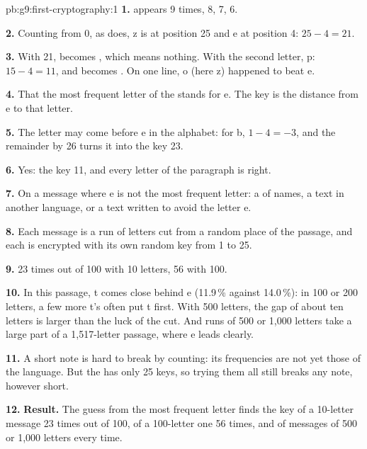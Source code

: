 \begin{solution}{pb:g9:first-cryptography:1}
\textbf{1.}  appears 9 times,  8,  7,  6.

\textbf{2.} Counting from 0, as  does, z is at
position 25 and e at position 4: $25 - 4 = 21$.

\textbf{3.} With 21,  becomes , which means nothing. With the
second letter, p: $15 - 4 = 11$, and  becomes . On one line,
o (here z) happened to beat e.

\textbf{4.} That the most frequent letter of the  stands for e. The key
is the distance from e to that letter.

\textbf{5.} The letter may come before e in the alphabet: for b, $1 - 4 = -3$, and
the remainder by 26 turns it into the key 23.

\label{out:g9:first-cryptography:guess-shift}

\textbf{6.} Yes: the key 11, and every letter of the paragraph is right.

\textbf{7.} On a message where e is not the most frequent letter: a  of
names, a text in another language, or a text written to avoid the letter e.

\textbf{8.} Each message is a run of letters cut from a random place of the
passage, and each is encrypted with its own random key from 1 to 25.

\label{out:g9:first-cryptography:short}

\textbf{9.} 23 times out of 100 with 10 letters, 56 with 100.

\textbf{10.} In this passage, t comes close behind e (11.9\,\% against 14.0\,\%):
in 100 or 200 letters, a few more t's often put t first. With 500 letters, the
gap of about ten letters is larger than the luck of the cut. And runs of 500 or
1,000 letters take a large part of a 1,517-letter passage, where e leads
clearly.

\textbf{11.} A short note is hard to break by counting: its frequencies are not
yet those of the language. But the  has only 25 keys, so trying
them all still breaks any note, however short.

\textbf{12.} \textbf{Result.} The guess from the most frequent letter finds the key
of a 10-letter message 23 times out of 100, of a 100-letter one 56 times, and of
messages of 500 or 1,000 letters every time.
\end{solution}
